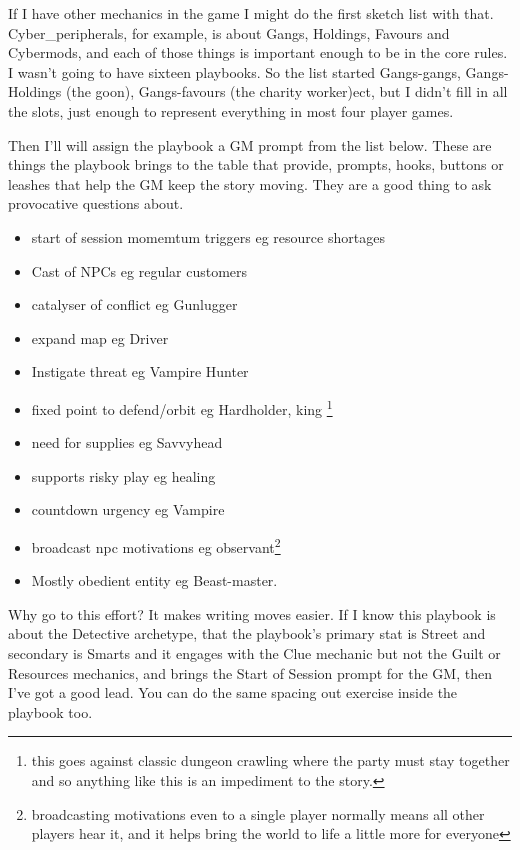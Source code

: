 \documentclass{tufte-handout}
\begin{document}
If I have other mechanics in the game I might do the first sketch list with that. Cyber\_peripherals, for example, is about Gangs, Holdings, Favours and Cybermods, and each of those things is important enough to be in the core rules. I wasn't going to have sixteen playbooks. So the list started Gangs-gangs, Gangs-Holdings (the goon), Gangs-favours (the charity worker)ect, but I didn't fill in all the slots, just enough to represent everything in most four player games.

Then I'll will assign the playbook a GM prompt from the list below. These are things the playbook brings to the table that provide, prompts, hooks, buttons or leashes that help the GM keep the story moving.  They are a good thing to ask provocative questions about.

\begin{itemize}
\item start of session momemtum triggers eg resource shortages
\item Cast of NPCs  eg regular customers
\item catalyser of conflict eg Gunlugger
\item expand map eg Driver
\item Instigate threat eg Vampire Hunter
\item fixed point to defend/orbit eg Hardholder, king \footnote{this goes against classic dungeon crawling where the party must stay together and so anything like this is an impediment to the story.}
\item need for supplies eg Savvyhead
\item supports risky play eg healing
\item countdown urgency eg Vampire
\item broadcast npc motivations eg observant\footnote{broadcasting motivations even to a single player normally means all other players hear it, and it helps bring the world to life a little more for everyone}
\item Mostly obedient entity eg Beast-master.
\end{itemize}

Why go to this effort? It makes writing moves easier. If I know this playbook is about the Detective archetype, that the playbook's primary stat is Street and secondary is Smarts and it engages with the Clue mechanic but not the Guilt or Resources mechanics, and brings the Start of Session prompt for the GM, then I've got a good lead. You can do the same spacing out exercise inside the playbook too. 
\end{document}
